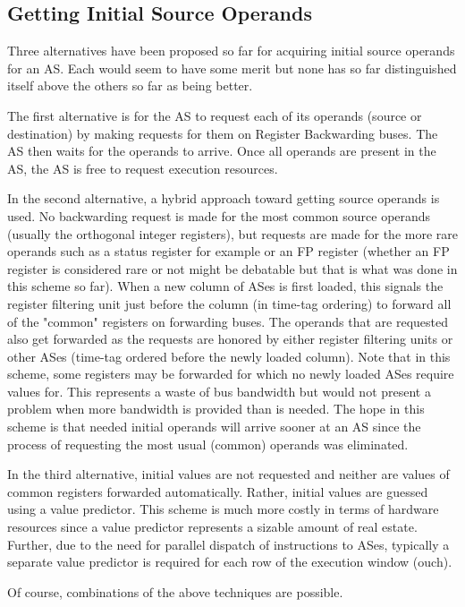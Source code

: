 \documentclass[10pt,dvips]{article}
\begin{document}
\subsection{Getting Initial Source Operands}
%
Three alternatives have been proposed so far for acquiring
initial source operands for an AS.  Each would seem to have
some merit but none has so far distinguished itself above the others
so far as being better.

The first alternative is for the AS to request each of its operands
(source or destination) by making requests for them on Register
Backwarding buses.  The AS then waits for the operands to arrive.  Once
all operands are present in the AS, the AS is free to request execution
resources.

In the second alternative, a hybrid approach toward getting source
operands is used.  No backwarding request is made for the most common
source operands (usually the orthogonal integer registers), but
requests are made for the more rare operands such as a status register
for example or an FP register (whether an FP register is considered
rare or not might be debatable but that is what was done in this scheme
so far).  When a new column of ASes is first loaded, this signals the
register filtering unit just before the column (in time-tag ordering)
to forward all of the "common" registers on forwarding buses.
The operands that are requested also get forwarded as the requests
are honored by either register filtering units or other ASes (time-tag
ordered before the newly loaded column).  
Note that in this scheme, some registers may be forwarded for which
no newly loaded ASes require values for.  This represents a waste
of bus bandwidth but would not present a problem when more bandwidth
is provided than is needed.  The hope in this scheme is that
needed initial operands will arrive sooner at an AS since the
process of requesting the most usual (common) operands was eliminated.

In the third alternative, initial values are not requested and neither
are values of common registers forwarded automatically.  Rather,
initial values are guessed using a value predictor.  This scheme is
much more costly in terms of hardware resources since a value
predictor represents a sizable amount of real estate.  Further,
due to the need for parallel dispatch of instructions to ASes,
typically a separate value predictor is required for each row of
the execution window (ouch).

Of course, combinations of the above techniques are possible.
%
\end{document}
